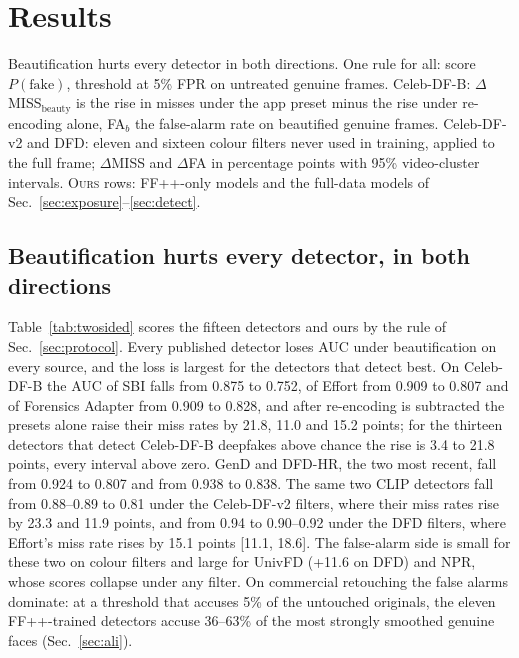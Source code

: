 \documentclass[conference]{IEEEtran}
\newcommand{\ours}{\textsc{Ours}}
\begin{document}
\section{Results}
\label{sec:results}
\begin{table}[t]
\centering
\caption{Beautification hurts every detector in both directions. One rule for all: score $P(\text{fake})$, threshold at
5\% FPR on untreated genuine frames. Celeb-DF-B: $\Delta$MISS$_\text{beauty}$ is the rise in misses under the app preset
minus the rise under re-encoding alone, FA$_b$ the false-alarm rate on beautified genuine frames. Celeb-DF-v2 and DFD:
eleven and sixteen colour filters never used in training, applied to the full frame; $\Delta$MISS and $\Delta$FA in
percentage points with 95\% video-cluster intervals. \ours{} rows: FF++-only models and the full-data models of
Sec.~\ref{sec:exposure}--\ref{sec:detect}.}
\label{tab:twosided}
\scriptsize
\begin{adjustbox}{max width=\textwidth}\end{adjustbox}
\end{table}

\subsection{Beautification hurts every detector, in both directions}
\label{sec:measure}
Table~\ref{tab:twosided} scores the fifteen detectors and ours by the rule of Sec.~\ref{sec:protocol}. Every published
detector loses AUC under beautification on every source, and the loss is largest for the detectors that detect best. On
Celeb-DF-B the AUC of SBI falls from 0.875 to 0.752, of Effort from 0.909 to 0.807 and of Forensics Adapter from 0.909
to 0.828, and after re-encoding is subtracted the presets alone raise their miss rates by 21.8, 11.0 and 15.2 points; for
the thirteen detectors that detect Celeb-DF-B deepfakes above chance the rise is 3.4 to 21.8 points, every interval above
zero. GenD and DFD-HR, the two most recent, fall from 0.924 to 0.807 and from 0.938 to 0.838. The same two CLIP detectors fall from 0.88--0.89 to 0.81 under the Celeb-DF-v2 filters, where their miss rates rise
by 23.3 and 11.9 points, and from 0.94 to 0.90--0.92 under the DFD filters, where Effort's miss rate rises by 15.1
points [11.1, 18.6]. The false-alarm side is small for these two on colour filters and large for UnivFD (+11.6 on DFD)
and NPR, whose scores collapse under any filter. On commercial retouching the false alarms dominate: at a threshold that
accuses 5\% of the untouched originals, the eleven FF++-trained detectors accuse 36--63\% of the most strongly smoothed
genuine faces (Sec.~\ref{sec:ali}).
\end{document}

